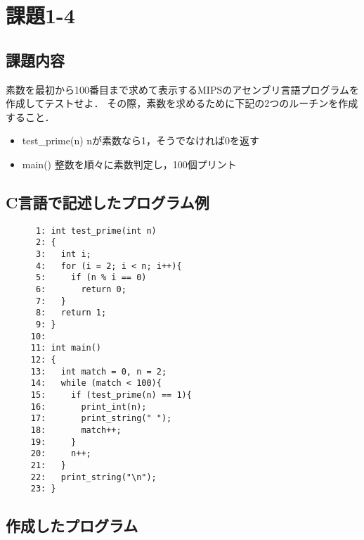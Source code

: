 \documentclass[a4j,11pt]{jarticle}
\begin{document}
\section{課題1-4}
\subsection{課題内容}
素数を最初から100番目まで求めて表示するMIPSのアセンブリ言語プログラムを作成してテストせよ． 
その際，素数を求めるために下記の2つのルーチンを作成すること．

\begin{itemize}
      \item test\_prime(n)    nが素数なら1，そうでなければ0を返す
      \item main()       整数を順々に素数判定し，100個プリント
\end{itemize}

\subsection{C言語で記述したプログラム例}

\begin{verbatim}
      1: int test_prime(int n)
      2: {
      3:   int i;
      4:   for (i = 2; i < n; i++){
      5:     if (n % i == 0)
      6:       return 0;
      7:   }
      8:   return 1;
      9: }
     10: 
     11: int main()
     12: {
     13:   int match = 0, n = 2;
     14:   while (match < 100){
     15:     if (test_prime(n) == 1){
     16:       print_int(n);
     17:       print_string(" ");
     18:       match++;
     19:     }
     20:     n++;
     21:   }
     22:   print_string("\n");
     23: }
\end{verbatim}

\subsection{作成したプログラム}
\end{document}
